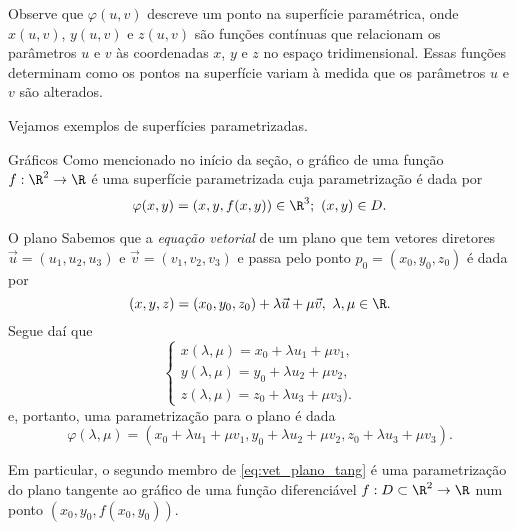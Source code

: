 Observe que \(\varphi(u, v)\) descreve um ponto na superfície paramétrica, onde \(x(u, v)\), \(y(u, v)\) e \(z(u, v)\) são funções contínuas que relacionam os parâmetros \(u\) e \(v\) às coordenadas \(x\), \(y\) e \(z\) no espaço tridimensional. Essas funções determinam como os pontos na superfície variam à medida que os parâmetros \(u\) e \(v\) são alterados.

Vejamos exemplos de  superfícies parametrizadas.

\begin{example}{Gráficos}{}
Como mencionado no início da seção, o gráfico de uma função $f:\R^2\to\R$ é uma superfície parametrizada cuja parametrização é dada por 
$$\varphi(x,y)=(x,y,f(x,y))\in\R^3;~(x,y)\in D.$$
\end{example}

\begin{example}{O plano}{}
Sabemos que a \textit{equação vetorial} de um plano que tem vetores diretores $\vec{u}=(u_1,u_2,u_3)$ e $\vec{v}=(v_1,v_2,v_3)$ e passa pelo ponto $p_0=(x_0,y_0,z_0)$ é dada por
$$(x,y,z)=(x_0,y_0,z_0) + \lambda \vec{u} + \mu \vec{v},~\lambda,\mu\in\R. $$
Segue daí que 
$$
\begin{cases}
    x(\lambda,\mu)=x_0+\lambda u_1 + \mu v_1, 
    \\
    y(\lambda,\mu)= y_0+\lambda u_2 + \mu v_2,
    \\
    z(\lambda,\mu)=z_0+\lambda u_3 + \mu v_3).
    \end{cases}$$
e, portanto, uma parametrização para o plano é dada 
$$\varphi(\lambda,\mu)=(x_0+\lambda u_1 + \mu v_1,y_0+\lambda u_2 + \mu v_2,z_0+\lambda u_3 + \mu v_3).$$

Em particular, o segundo membro de \eqref{eq:vet_plano_tang} é uma parametrização do plano tangente ao gráfico de uma função diferenciável $f:D\subset\R^2\to\R$ num ponto $(x_0,y_0,f(x_0,y_0))$. 
\end{example}

